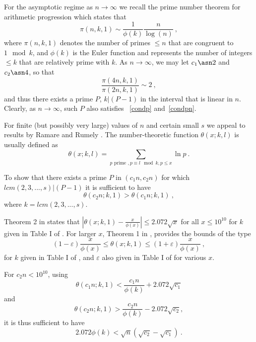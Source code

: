 For the asymptotic regime as $n \rightarrow \infty$ we recall the
prime number theorem for arithmetic progression \cite{sopro} which
states that
\begin{equation}
\pi(n,k,1) \sim \frac{1}{\phi(k)} \frac{n}{\log(n)}~,
\end{equation}
where $\pi(n,k,1)$ denotes the number of primes $\leq n$ that are
congruent to $1 \mod k$, and $\phi(k)$ is the Euler function and
represents the number of integers $\leq k$ that are relatively
prime with $k$. As $n \rightarrow \infty$, we may let $c_1 \asn 2$
and $c_2 \asn 4$, so that
\begin{equation}
\frac{\pi(4n,k,1)}{\pi(2n,k,1)} \sim 2~,
\end{equation}
and thus there exists a prime $P$, $k | (P-1)$ in the interval
that is linear in $n$. Clearly, as $n \rightarrow \infty$, such
$P$ also satisfies ~\eqref{condp} and~\eqref{condpn}.



For finite (but possibly very large) values of $n$ and certain
small $s$ we appeal to results by Ramare and Rumely
\cite{rrumely}. The number-theoretic function $\theta(x;k,l)$ is
usually defined as
\[\theta(x;k,l)=\sum_{p \text{ prime }, p \equiv l\mod k, p
\leq x} \ln p~.\]

To show that there exists a prime $P$ in $(c_1n,c_2n)$ for which
$lcm(2,3,...,s) | (P-1)$  it is sufficient to have
\begin{equation} \theta(c_2n;k,1)> \theta(c_1n;k,1)~,\end{equation}
where $k=lcm(2,3,...,s)$.

Theorem 2 in \cite{rrumely} states that $|\theta(x;k,1)
-\frac{x}{\phi(x)}| \leq 2.072 \sqrt{x}$ for all $x \leq 10 ^{10}$
for $k$ given in Table I of \cite{rrumely}. For larger $x$,
Theorem 1 in \cite{rrumely}, provides the bounds of the type
\begin{equation}
(1-\varepsilon)\frac{x}{\phi(x)} \leq \theta(x;k,1) \leq
(1+\varepsilon)\frac{x}{\phi(x)}~,
\end{equation}
for $k$ given in Table I of \cite{rrumely}, and $\varepsilon$ also
given in Table I of \cite{rrumely} for various $x$.


For $c_2n < 10^{10}$, using \[\theta(c_1n;k,1) <
\frac{c_1n}{\phi(k)}+2.072\sqrt{c_1}
\]
and \[\theta(c_2n;k,1) > \frac{c_2n}{\phi(k)}-2.072\sqrt{c_2},
\]it is thus sufficient to have
\begin{equation}\label{cond1}
2.072\phi(k) < \sqrt{n}(\sqrt{c_2}-\sqrt{c_1})~.
\end{equation}

